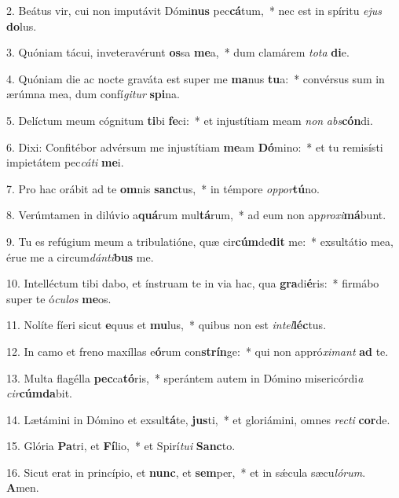2. Beátus vir, cui non imputávit Dómi\textbf{nus} pec\textbf{cá}tum,~*  nec est in spíritu \textit{e}\textit{jus} \textbf{do}lus.\

3. Quóniam tácui, inveteravérunt \textbf{os}sa \textbf{me}a,~*  dum clamárem \textit{to}\textit{ta} \textbf{di}e.\

4. Quóniam die ac nocte graváta est super me \textbf{ma}nus \textbf{tu}a:~*  convérsus sum in ærúmna mea, dum confí\textit{gi}\textit{tur} \textbf{spi}na.\

5. Delíctum meum cógnitum \textbf{ti}bi \textbf{fe}ci:~*  et injustítiam meam \textit{non} \textit{abs}\textbf{cón}di.\

6. Dixi: Confitébor advérsum me injustítiam \textbf{me}am \textbf{Dó}mino:~*  et tu remisísti impietátem pec\textit{cá}\textit{ti} \textbf{me}i.\

7. Pro hac orábit ad te \textbf{om}nis \textbf{sanc}tus,~*  in témpore \textit{op}\textit{por}\textbf{tú}no.\

8. Verúmtamen in dilúvio a\textbf{quá}rum mul\textbf{tá}rum,~*  ad eum non ap\textit{pro}\textit{xi}\textbf{má}bunt.\

9. Tu es refúgium meum a tribulatióne, quæ cir\textbf{cúm}de\textbf{dit} me:~*  exsultátio mea, érue me a circum\textit{dán}\textit{ti}\textbf{bus} me.\

10. Intelléctum tibi dabo, et ínstruam te in via hac, qua \textbf{gra}di\textbf{é}ris:~*  firmábo super te ó\textit{cu}\textit{los} \textbf{me}os.\

11. Nolíte fíeri sicut \textbf{e}quus et \textbf{mu}lus,~*  quibus non est \textit{in}\textit{tel}\textbf{léc}tus.\

12. In camo et freno maxíllas e\textbf{ó}rum con\textbf{strín}ge:~*  qui non appró\textit{xi}\textit{mant} \textbf{ad} te.\

13. Multa flagélla \textbf{pec}ca\textbf{tó}ris,~*  sperántem autem in Dómino misericórdi\textit{a} \textit{cir}\textbf{cúm}\textbf{da}bit.\

14. Lætámini in Dómino et exsul\textbf{tá}te, \textbf{jus}ti,~*  et gloriámini, omnes \textit{rec}\textit{ti} \textbf{cor}de.\

15. Glória \textbf{Pa}tri, et \textbf{Fí}lio,~*  et Spirí\textit{tu}\textit{i} \textbf{Sanc}to.\

16. Sicut erat in princípio, et \textbf{nunc}, et \textbf{sem}per,~*  et in sǽcula sæcu\textit{ló}\textit{rum}. \textbf{A}men.\

